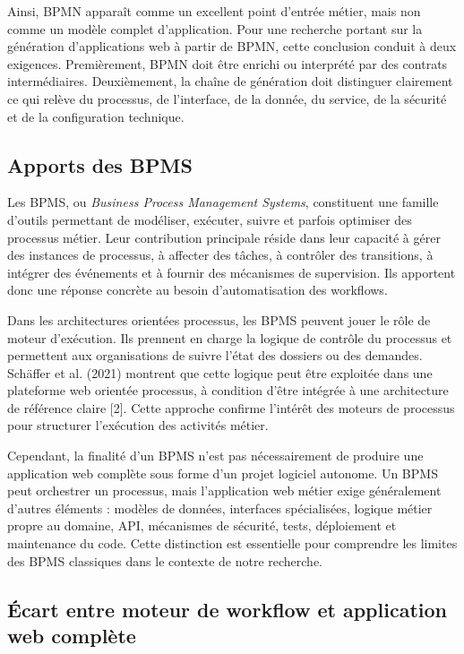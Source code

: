 Ainsi, BPMN apparaît comme un excellent point d'entrée métier, mais non comme un modèle complet d'application. Pour une recherche portant sur la génération d'applications web à partir de BPMN, cette conclusion conduit à deux exigences. Premièrement, BPMN doit être enrichi ou interprété par des contrats intermédiaires. Deuxièmement, la chaîne de génération doit distinguer clairement ce qui relève du processus, de l'interface, de la donnée, du service, de la sécurité et de la configuration technique.


\subsection{Apports des BPMS}

Les BPMS, ou \textit{Business Process Management Systems}, constituent une famille d'outils permettant de modéliser, exécuter, suivre et parfois optimiser des processus métier. Leur contribution principale réside dans leur capacité à gérer des instances de processus, à affecter des tâches, à contrôler des transitions, à intégrer des événements et à fournir des mécanismes de supervision. Ils apportent donc une réponse concrète au besoin d'automatisation des workflows.

Dans les architectures orientées processus, les BPMS peuvent jouer le rôle de moteur d'exécution. Ils prennent en charge la logique de contrôle du processus et permettent aux organisations de suivre l'état des dossiers ou des demandes. Schäffer et al. (2021) montrent que cette logique peut être exploitée dans une plateforme web orientée processus, à condition d'être intégrée à une architecture de référence claire [2]. Cette approche confirme l'intérêt des moteurs de processus pour structurer l'exécution des activités métier.

Cependant, la finalité d'un BPMS n'est pas nécessairement de produire une application web complète sous forme d'un projet logiciel autonome. Un BPMS peut orchestrer un processus, mais l'application web métier exige généralement d'autres éléments : modèles de données, interfaces spécialisées, logique métier propre au domaine, API, mécanismes de sécurité, tests, déploiement et maintenance du code. Cette distinction est essentielle pour comprendre les limites des BPMS classiques dans le contexte de notre recherche.

\subsection{Écart entre moteur de workflow et application web complète}

